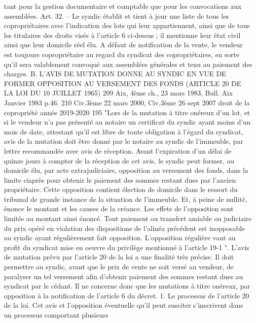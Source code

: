 	tant pour la gestion documentaire et comptable que pour les convocations aux assemblées.
	Art. 32. – Le syndic établit et tient à jour une liste de tous les copropriétaires avec l'indication des lots qui
	leur appartiennent, ainsi que de tous les titulaires des droits visés à l'article 6 ci-dessus ; il mentionne leur
	état civil ainsi que leur domicile réel élu.
	A défaut de notification de la vente, le vendeur est toujours copropriétaire au regard du syndicat des
	copropriétaires, en sorte qu’il sera valablement convoqué aux assemblées générales et tenu au paiement
	des charges.
	B. L’AVIS DE MUTATION DONNE AU SYNDIC EN VUE DE FORMER OPPOSITION AU
	VERSEMENT DES FONDS (ARTICLE 20 DE LA LOI DU 10 JUILLET 1965)
	209 Aix, 4ème ch., 23 mars 1983, Bull. Aix Janvier 1983  p.46.
	210 Civ.3ème 22 mars 2000, Civ.3ème 26 sept 2007
	droit de la copropriété année 2019-2020
	195
	"Lors de la mutation à titre onéreux d'un lot, et si le vendeur n'a pas présenté au notaire un certificat du
	syndic ayant moins d'un mois de date, attestant qu'il est libre de toute obligation à l'égard du syndicat, avis
	de la mutation doit être donné par le notaire au syndic de l'immeuble, par lettre recommandée avec avis
	de réception. Avant l'expiration d'un délai de quinze jours à compter de la réception de cet avis, le syndic
	peut former, au domicile élu, par acte extrajudiciaire, opposition au versement des fonds, dans la limite ciaprès
	pour obtenir le paiement des sommes restant dues par l'ancien propriétaire. Cette opposition
	contient élection de domicile dans le ressort du tribunal de grande instance de la situation de l'immeuble.
	Et, à peine de nullité, énonce le montant et les causes de la créance. Les effets de l'opposition sont limités
	au montant ainsi énoncé.
	Tout paiement ou transfert amiable ou judiciaire du prix opéré en violation des dispositions de l'alinéa
	précédent est inopposable au syndic ayant régulièrement fait opposition.
	L'opposition régulière vaut au profit du syndicat mise en oeuvre du privilège mentionné à l'article 19-1 ".
	L'avis de mutation prévu par l'article 20 de la loi a une finalité très précise. Il doit permettre au syndic,
	avant que le prix de vente ne soit versé au vendeur, de paralyser un tel versement afin d'obtenir paiement
	des sommes restant dues au syndicat par le cédant.
	Il ne concerne donc que les mutations à titre onéreux, par opposition à la notification de l’article 6 du
	décret.
	1. Le processus de l'article 20 de la loi.
	Cet avis et l'opposition éventuelle qu'il peut susciter s'inscrivent dans un processus comportant plusieurs
